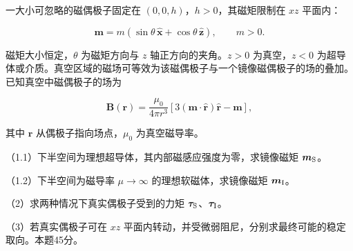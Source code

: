 \documentclass[12pt,a4paper,fontset=fandol]{ctexart}
\begin{document}
一大小可忽略的磁偶极子固定在 \((0,0,h)\)，\(h>0\)，其磁矩限制在 \(xz\)
平面内：

\[
\boldsymbol m=m(\sin\theta\,\hat{\boldsymbol x}+\cos\theta\,\hat{\boldsymbol z}),
\qquad m>0.
\]

磁矩大小恒定，\(\theta\) 为磁矩方向与 \(z\) 轴正方向的夹角。\(z>0\)
为真空，\(z<0\)
为超导体或介质。真空区域的磁场可等效为该磁偶极子与一个镜像磁偶极子的场的叠加。已知真空中磁偶极子的场为

\[
\boldsymbol B(\boldsymbol r)=\frac{\mu_0}{4\pi r^3}
\left[3(\boldsymbol m\cdot\hat{\boldsymbol r})\hat{\boldsymbol r}
-\boldsymbol m\right],
\]

其中 \(\boldsymbol r\) 从偶极子指向场点，\(\mu_0\) 为真空磁导率。

（1.1）下半空间为理想超导体，其内部磁感应强度为零，求镜像磁矩
\(\boldsymbol m_{\rm S}\)。

（1.2）下半空间为磁导率 \(\mu\to\infty\) 的理想软磁体，求镜像磁矩
\(\boldsymbol m_{\rm I}\)。

（2）求两种情况下真实偶极子受到的力矩
\(\boldsymbol\tau_{\rm S}\)、\(\boldsymbol\tau_{\rm I}\)。

（3）若真实偶极子可在 \(xz\)
平面内转动，并受微弱阻尼，分别求最终可能的稳定取向。本题45分。

\begin{center}
\begin{minipage}{\linewidth}
\centering\begingroup
{}
\ifdim\wd\diagrambox>.88\linewidth
\sbox{\diagrambox}{\resizebox{.88\linewidth}{!}{\usebox{\diagrambox}}}
\fi
\ifdim\ht\diagrambox>.29\textheight
\resizebox{!}{.29\textheight}{\usebox{\diagrambox}}
\else\usebox{\diagrambox}\fi
\par{}
\endgroup\end{minipage}
\end{center}
\end{document}
